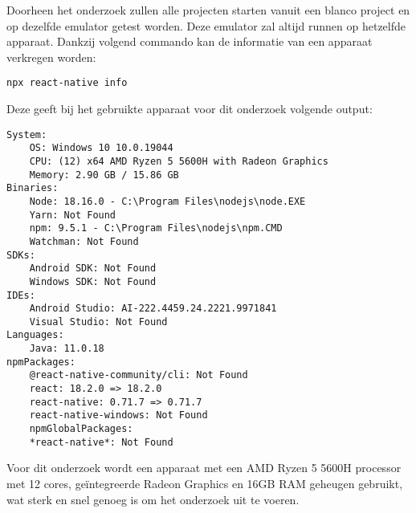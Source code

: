 Doorheen het onderzoek zullen alle projecten starten vanuit een blanco project en op dezelfde emulator 
getest worden. Deze emulator zal altijd runnen op hetzelfde apparaat. Dankzij volgend commando 
kan de informatie van een apparaat verkregen worden:
\begin{verbatim}
npx react-native info
\end{verbatim}
Deze geeft bij het gebruikte apparaat voor dit onderzoek volgende output:
\begin{verbatim}
System:
    OS: Windows 10 10.0.19044
    CPU: (12) x64 AMD Ryzen 5 5600H with Radeon Graphics
    Memory: 2.90 GB / 15.86 GB
Binaries:
    Node: 18.16.0 - C:\Program Files\nodejs\node.EXE
    Yarn: Not Found
    npm: 9.5.1 - C:\Program Files\nodejs\npm.CMD
    Watchman: Not Found
SDKs:
    Android SDK: Not Found
    Windows SDK: Not Found
IDEs:
    Android Studio: AI-222.4459.24.2221.9971841
    Visual Studio: Not Found
Languages:
    Java: 11.0.18
npmPackages:
    @react-native-community/cli: Not Found
    react: 18.2.0 => 18.2.0 
    react-native: 0.71.7 => 0.71.7 
    react-native-windows: Not Found
    npmGlobalPackages:
    *react-native*: Not Found
\end{verbatim}
Voor dit onderzoek wordt een apparaat met een AMD Ryzen 5 5600H processor 
met 12 cores, geïntegreerde Radeon Graphics en 16GB RAM geheugen gebruikt, wat sterk en snel 
genoeg is om het onderzoek uit te voeren.